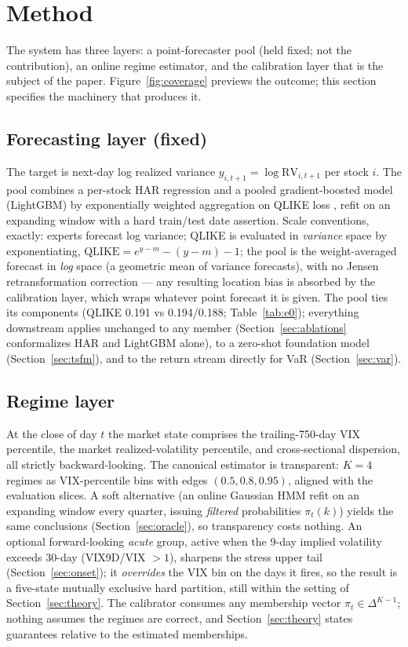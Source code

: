 \section{Method}\label{sec:method}

The system has three layers: a point-forecaster pool (held fixed; not the
contribution), an online regime estimator, and the calibration layer that
is the subject of the paper. Figure~\ref{fig:coverage} previews the
outcome; this section specifies the machinery that produces it.

\subsection{Forecasting layer (fixed)}

The target is next-day log realized variance $y_{i,t+1} = \log
\mathrm{RV}_{i,t+1}$ per stock $i$. The pool combines a per-stock HAR
regression \citep{corsi2009simple} and a pooled gradient-boosted model
(LightGBM) by exponentially weighted aggregation on QLIKE loss
\citep{patton2011volatility}, refit on an expanding window with a hard
train/test date assertion. Scale conventions, exactly: experts forecast
log variance; QLIKE is evaluated in \emph{variance} space by
exponentiating, $\mathrm{QLIKE} = e^{y - m} - (y - m) - 1$; the pool is
the weight-averaged forecast in \emph{log} space (a geometric mean of
variance forecasts), with no Jensen retransformation correction ---
any resulting location bias is absorbed by the calibration layer, which
wraps whatever point forecast it is given. The pool ties its components (QLIKE 0.191 vs
0.194/0.188; Table~\ref{tab:e0}); everything downstream applies unchanged
to any member (Section~\ref{sec:ablations} conformalizes HAR and LightGBM
alone), to a zero-shot foundation model (Section~\ref{sec:tsfm}), and to
the return stream directly for VaR (Section~\ref{sec:var}).

\subsection{Regime layer}

At the close of day $t$ the market state comprises the trailing-750-day
VIX percentile, the market realized-volatility percentile, and
cross-sectional dispersion, all strictly backward-looking. The canonical
estimator is transparent: $K = 4$ regimes as VIX-percentile bins with
edges $(0.5, 0.8, 0.95)$, aligned with the evaluation slices. A soft
alternative (an online Gaussian HMM refit on an expanding window every
quarter, issuing \emph{filtered} probabilities $\pi_t(k)$) yields the
same conclusions (Section~\ref{sec:oracle}), so transparency costs
nothing. An optional forward-looking \emph{acute} group, active when the
9-day implied volatility exceeds 30-day (VIX9D/VIX $> 1$), sharpens the
stress upper tail (Section~\ref{sec:onset}); it \emph{overrides} the VIX
bin on the days it fires, so the result is a five-state mutually
exclusive hard partition, still within the setting of
Section~\ref{sec:theory}. The calibrator consumes any
membership vector $\pi_t \in \Delta^{K-1}$; nothing assumes the regimes
are correct, and Section~\ref{sec:theory} states guarantees relative to
the estimated memberships.

